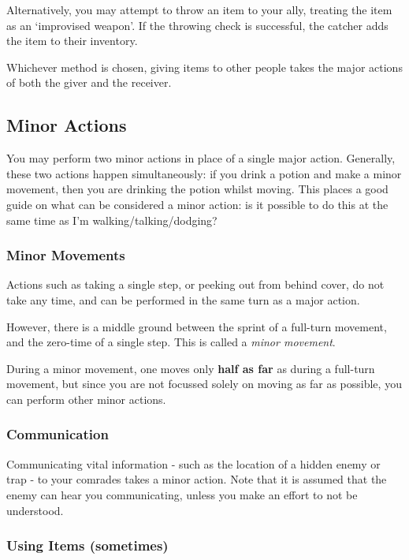 Alternatively, you may attempt to throw an item to your ally, treating the item as an `improvised weapon'. If the throwing check is successful, the catcher adds the item to their inventory. 

Whichever method is chosen, giving items to other people takes the major actions of both the giver and the receiver. 


\subsection{Minor Actions}
You may perform two minor actions in place of a single major action. Generally, these two actions happen simultaneously: if you drink a potion and make a minor movement, then you are drinking the potion whilst moving. This places a good guide on what can be considered a minor action: is it possible to do this at the same time as I'm walking/talking/dodging? 

\subsubsection{Minor Movements} 

Actions such as taking a single step, or peeking out from behind cover, do not take any time, and can be performed in the same turn as a major action. 

However, there is a middle ground between the sprint of a full-turn movement, and the zero-time of a single step. This is called a {\it minor movement}. 

During a minor movement, one moves only {\bf half as far} as during a full-turn movement, but since you are not focussed solely on moving as far as possible, you can perform other minor actions. 

\subsubsection{Communication} 

Communicating vital information - such as the location of a hidden enemy or trap - to your comrades takes a minor action. Note that it is assumed that the enemy can hear you communicating, unless you make an effort to not be understood. 

\subsubsection{Using Items (sometimes)}

